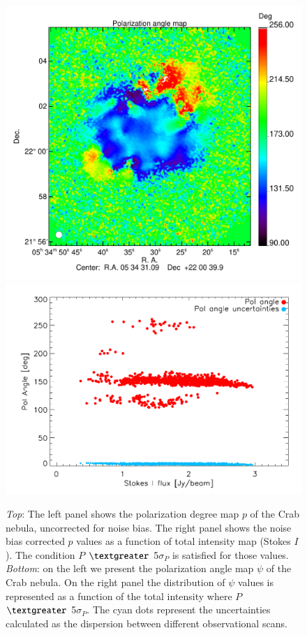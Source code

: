 \documentclass[twocolumn,traditabstract]{aa}
\begin{document}
\begin{figure}
\includegraphics[clip, angle=0, scale = 0.35]{figures/Crab_angle2_2mm.pdf}
\includegraphics[clip, angle=0, scale = 0.5]{figures/pol_angle_vs_I_2mm.pdf}
\caption{{\it Top}: The left panel shows the polarization
  degree map $p$ of the Crab nebula, uncorrected for noise bias. The right panel shows the noise bias
  corrected $p$ values as a function of total intensity map (Stokes $I$). The
  condition $P$ $\textgreater$ 5$\sigma_{P}$ is satisfied for those values. {\it
    Bottom}: on the left we present the polarization angle map $\psi$ of the
  Crab nebula. On the right panel the distribution of $\psi$ values is
  represented as a function of the total intensity where $P$ $\textgreater$
  5$\sigma_{P}$. The cyan dots represent the uncertainties calculated as the
  dispersion between different observational scans.}
\label{fig:pol_degree}
\end{figure}
\end{document}
